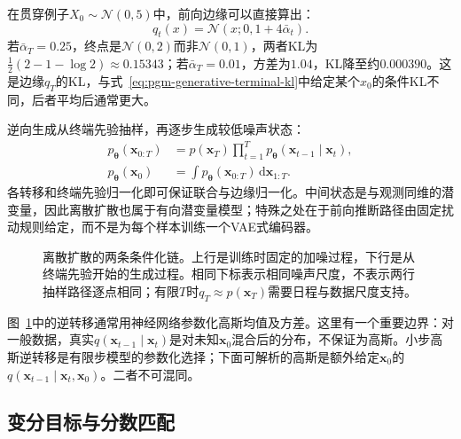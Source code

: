 在贯穿例子$X_0\sim\mathcal{N}(0,5)$中，前向边缘可以直接算出：
\begin{equation}
  \label{eq:pgm-generative-gaussian-diffusion}
  q_t(x)=\mathcal{N}(x;0,1+4\bar{\alpha}_t).
\end{equation}
若$\bar{\alpha}_T=0.25$，终点是$\mathcal{N}(0,2)$而非$\mathcal{N}(0,1)$，两者KL为$\tfrac12(2-1-\log2)\approx0.15343$；若$\bar{\alpha}_T=0.01$，方差为$1.04$，KL降至约$0.000390$。这是边缘$q_T$的KL，与式~\eqref{eq:pgm-generative-terminal-kl}中给定某个$x_0$的条件KL不同，后者平均后通常更大。

逆向生成从终端先验抽样，再逐步生成较低噪声状态：
\begin{equation}
  \label{eq:pgm-generative-reverse-joint}
  \begin{aligned}
    p_{\bm{\theta}}(\bm{x}_{0:T})
      &=p(\bm{x}_T)
          \prod_{t=1}^{T}p_{\bm{\theta}}
             (\bm{x}_{t-1}\mid\bm{x}_t),\\
    p_{\bm{\theta}}(\bm{x}_0)
      &=\int p_{\bm{\theta}}(\bm{x}_{0:T})
               \,\mathrm{d}\bm{x}_{1:T}.
  \end{aligned}
\end{equation}
各转移和终端先验归一化即可保证联合与边缘归一化。中间状态是与观测同维的潜变量，因此离散扩散也属于有向潜变量模型；特殊之处在于前向推断路径由固定扰动规则给定，而不是为每个样本训练一个VAE式编码器。

\begin{figure}[htbp]
  \centering
  
  \caption{离散扩散的两条条件化链。上行是训练时固定的加噪过程，下行是从终端先验开始的生成过程。相同下标表示相同噪声尺度，不表示两行抽样路径逐点相同；有限$T$时$q_T\approx p(\bm{x}_T)$需要日程与数据尺度支持。}
  \label{fig:pgm-generative-diffusion}
\end{figure}

图~\ref{fig:pgm-generative-diffusion}中的逆转移通常用神经网络参数化高斯均值及方差。这里有一个重要边界：对一般数据，真实$q(\bm{x}_{t-1}\mid\bm{x}_t)$是对未知$\bm{x}_0$混合后的分布，不保证为高斯。小步高斯逆转移是有限步模型的参数化选择；下面可解析的高斯是额外给定$\bm{x}_0$的$q(\bm{x}_{t-1}\mid\bm{x}_t,\bm{x}_0)$。二者不可混同。

\subsection{变分目标与分数匹配}
\label{sec:pgm-generative-diffusion-objective}

